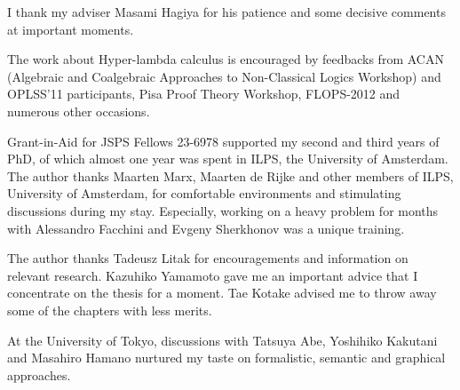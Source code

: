 \begin{acknowledge}
 I thank my adviser Masami Hagiya for his patience and some decisive
 comments at important moments.

 The work about Hyper-lambda calculus is encouraged by feedbacks from
 ACAN (Algebraic and Coalgebraic
 Approaches to
 Non-Classical Logics Workshop) and OPLSS'11 participants,
 Pisa Proof Theory Workshop, FLOPS-2012
 and numerous other occasions.

 Grant-in-Aid for JSPS Fellows 23-6978 supported
 my second and third years of PhD, of which almost one year was spent
 in ILPS, the University of Amsterdam.
 The author thanks Maarten Marx, Maarten de Rijke and other members of ILPS,
 University of Amsterdam, for
 comfortable environments and stimulating discussions during my stay.
 Especially, working on a heavy problem for months with Alessandro
 Facchini and Evgeny Sherkhonov was a unique training.

 The author thanks Tadeusz Litak for encouragements and
 information on relevant research.
 Kazuhiko Yamamoto gave me an important advice that I concentrate on the
 thesis for a moment.
 Tae Kotake advised me to throw away some of the chapters with less merits.

 At the University of Tokyo,
 discussions with Tatsuya Abe, Yoshihiko Kakutani and Masahiro Hamano
 nurtured my taste on formalistic, semantic and graphical approaches.
\end{acknowledge}
